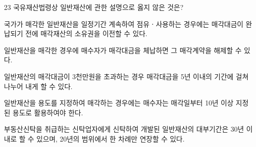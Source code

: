 \begin{question}{23}
국유재산법령상 일반재산에 관한 설명으로 옳지 않은 것은?
\begin{choices}
  \item 국가가 매각한 일반재산을 일정기간 계속하여 점유ㆍ사용하는 경우에는 매각대금이 완납되기 전에 매각재산의 소유권을 이전할 수 있다.
  \item 일반재산을 매각한 경우에 매수자가 매각대금을 체납하면 그 매각계약을 해제할 수 있다.
  \item 일반재산의 매각대금이 3천만원을 초과하는 경우 매각대금을 5년 이내의 기간에 걸쳐 나누어 내게 할 수 있다.
  \item 일반재산을 용도를 지정하여 매각하는 경우에는 매수자는 매각일부터 10년 이상 지정된 용도로 활용하여야 한다.
  \item 부동산신탁을 취급하는 신탁업자에게 신탁하여 개발된 일반재산의 대부기간은 30년 이내로 할 수 있으며, 20년의 범위에서 한 차례만 연장할 수 있다.
\end{choices}
\end{question}
